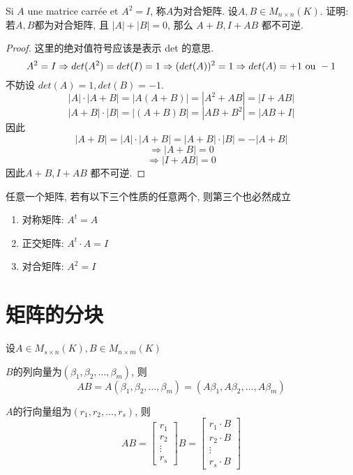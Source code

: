 \documentclass{book}
\begin{document}
\begin{question}
Si $A$ une matrice carr\'ee et $A^2 = I$, 称$A$为对合矩阵. 设$A, B \in M_{n \times n}(K)$.
证明: 若$A, B$都为对合矩阵, 且 $|A| + |B| = 0$, 那么 $A + B, I + AB$ 都不可逆. \\
\end{question}
\begin{proof}
这里的绝对值符号应该是表示 det 的意思.
$$
A^2 = I
\Rightarrow det(A^2) = det(I) = 1
\Rightarrow (det(A))^2 = 1
\Rightarrow det(A) = +1 \textrm{ ou } -1
$$
不妨设 $det(A) = 1, det(B) = -1$.
$$|A| \cdot |A + B| = |A(A + B)| = |A^2 + AB| = |I + AB|$$
$$|A + B| \cdot |B| = |(A + B)B| = |AB + B^2| = |AB + I|$$
因此 $$|A + B| = |A| \cdot |A + B| = |A + B| \cdot |B| = -|A + B|$$
$$\Rightarrow |A + B| = 0$$
$$\Rightarrow |I + AB| = 0$$
因此$A + B, I + AB$ 都不可逆.
\end{proof}

\begin{note}
任意一个矩阵, 若有以下三个性质的任意两个, 则第三个也必然成立
\begin{enumerate}
\item 对称矩阵: $A^t = A$
\item 正交矩阵: $A^t \cdot A = I$
\item 对合矩阵: $A^2 = I$
\end{enumerate}
\end{note}

\section{矩阵的分块}
\begin{remark}
设$A \in M_{s \times n}(K), B \in M_{n \times m}(K)$

$B$的列向量为$(\beta_1, \beta_2, \ldots, \beta_m)$, 则
$$AB = A(\beta_1, \beta_2, \ldots, \beta_m) = (A\beta_1, A\beta_2, \ldots, A\beta_m)$$

$A$的行向量组为$(r_1, r_2, \ldots, r_s)$, 则
$$
AB =
\begin{bmatrix}
r_1 \\
r_2 \\
\vdots \\
r_s
\end{bmatrix}
B =
\begin{bmatrix}
r_1 \cdot B \\
r_2 \cdot B \\
\vdots \\
r_s \cdot B
\end{bmatrix}
$$
\end{remark}
\end{document}
